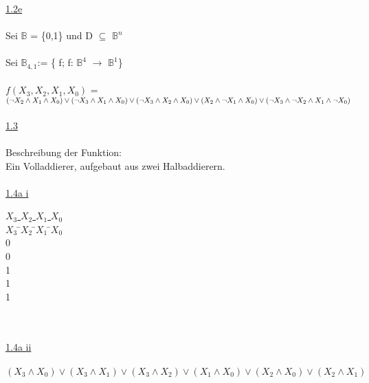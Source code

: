 \documentclass[a4paper,10pt]{scrartcl}
\begin{document}
\underline{1.2e}\\\\
Sei $\mathbb{B}$ = \{0,1\} und D $\subseteq$ $\mathbb{B}^n$\\\\
Sei $\mathbb{B}_{4,1}$:= \{ f; f: $\mathbb{B}^4$ $\rightarrow$ $\mathbb{B}^1$\}\\\\
$f(X_{3},X_{2},X_{1},X_{0})$ = \\\( (\lnot X_{2} \land X_{1} \land X_{0}) \lor (\lnot X_{3} \land X_{1} \land X_{0}) \lor (\lnot X_{3} \land X_{2} \land X_{0}) \lor (X_{2} \land \lnot X_{1} \land X_{0}) \\\lor (\lnot X_{3} \land \lnot X_{2} \land X_{1} \land \lnot X_{0})\)\\\\
\newpage
\noindent
\underline{1.3}\\\\
Beschreibung der Funktion:\\
Ein Volladdierer, aufgebaut aus zwei Halbaddierern.\\\\
\underline{1.4a i}
\begin{tabbing}
\underline{$X_{3}$ $X_{2}$ $X_{1}$ $X_{0}$} \\
$X_{3}$ \=$X_{2}$ \=$X_{1}$ \=$X_{0}$     \\
0    \\
0    \\
1    \\
1    \\
1    \\\\\\
\end{tabbing}
\underline{1.4a ii}\\\\
\((X_{3} \land X_{0}) \lor (X_{3} \land X_{1}) \lor (X_{3} \land X_{2}) \lor (X_{1} \land X_{0}) \lor (X_{2} \land X_{0}) \lor (X_{2} \land  X_{1})\)
\end{document}
